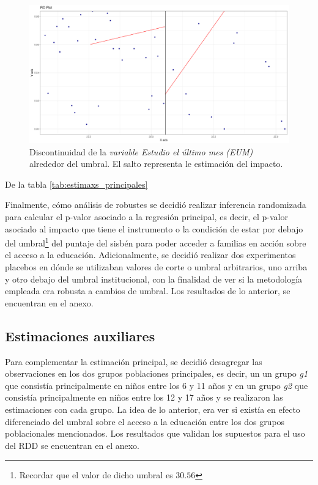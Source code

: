 \documentclass[AER]{AEA}
\begin{document}
\begin{figure}[h]
    \centering
    \includegraphics[scale = 0.3]{imagenes/estimax_principal/main_estimax_interes.png}
    \caption{Discontinuidad de la \textit{variable Estudio el último mes (EUM)} alrededor del umbral. El salto representa le estimación del impacto.}
    \label{fig:main_estimax_interes}
\end{figure}


De la tabla \ref{tab:estimaxs_principales} 

Finalmente, cómo análisis de robustes se decidió realizar inferencia randomizada para calcular el p-valor asociado a la regresión principal, es decir, el p-valor asociado al impacto que tiene el instrumento o la condición de estar por debajo del umbral\footnote{Recordar que el valor de dicho umbral es $30.56$} del puntaje del sisbén para poder acceder a familias en acción sobre el acceso a la educación. Adicionalmente, se decidió realizar dos experimentos placebos en dónde se utilizaban valores de corte o umbral arbitrarios, uno arriba y otro debajo del umbral institucional, con la finalidad de ver si la metodología empleada era robusta a cambios de umbral. Los resultados de lo anterior, se encuentran en el anexo. 

\subsection{Estimaciones auxiliares}

Para complementar la estimación principal, se decidió desagregar las observaciones en los dos grupos poblaciones principales, es decir, un un grupo \textit{g1} que consistía principalmente en niños entre los 6 y 11 años y en un grupo \textit{g2} que consistía principalmente en niños entre los 12 y 17 años y se realizaron las estimaciones con cada grupo. La idea de lo anterior, era ver si existía en efecto diferenciado del umbral sobre el acceso a la educación entre los dos grupos poblacionales mencionados. Los resultados que validan los supuestos para el uso del RDD se encuentran en el anexo. 
\end{document}
